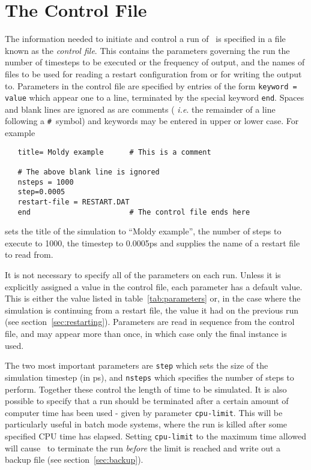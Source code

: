 \section{The Control File}%
\label{sec:control}

The information needed to initiate and control a run of \moldy\  is
specified in a file known as the {\em control file}. This contains the
parameters governing the run \eg the number of timesteps to be
executed or the frequency of output, and the names of files to be used
\eg for reading a restart configuration from or for writing the
output to. Parameters in the control file are specified by entries of the form
\verb'keyword = value'
which appear one to a line, terminated by the special keyword
\verb'end'.  Spaces and blank lines are ignored as are comments ({\em
i.e}. the remainder of a line following a \verb'#'~symbol) and
keywords may be entered in upper or lower case. For example
\begin{verbatim}
   title= Moldy example      # This is a comment

   # The above blank line is ignored
   nsteps = 1000
   step=0.0005
   restart-file = RESTART.DAT
   end                       # The control file ends here
\end{verbatim}
sets the title of the simulation to ``Moldy example'', the number of
steps to execute to 1000, the timestep to 0.0005ps and supplies the
name of a restart file to read from.

It is not necessary to specify all of the parameters on each run.
Unless it is explicitly assigned a value in the control file, each
parameter has a default value.  This is either the value listed in
table~\ref{tab:parameters} or, in the case where the simulation is
continuing from a restart file, the value it had on the previous run
(see section~\ref{sec:restarting}). Parameters are read in sequence
from the control file, and may appear more than once, in which case
only the final instance is used.  

The two most important parameters are \verb'step' which sets the size
of the simulation timestep (in ps), and \verb'nsteps' which specifies
the number of steps to perform.  Together these control the length of
time to be simulated.  It is also possible to specify that a run
should be terminated after a certain amount of computer time has been
used - given by parameter \verb'cpu-limit'.  This will be particularly
useful in batch mode systems, where the run is killed after some
specified CPU time has elapsed.  Setting \verb'cpu-limit' to the
maximum time allowed will cause \moldy\  to terminate the run {\em
before\/} the limit is reached and write out a backup file (see
section~\ref{sec:backup}).

